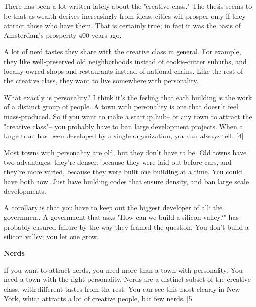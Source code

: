 There
                  has been a lot written lately about the "creative class." The
                  thesis seems to be that as wealth derives increasingly from
                  ideas, cities will prosper only if they attract those who have
                  them. That is certainly true; in fact it was the basis of
                  Amsterdam's prosperity 400 years ago.

A lot of nerd
                  tastes they share with the creative class in general. For
                  example, they like well-preserved old neighborhoods instead of
                  cookie-cutter suburbs, and locally-owned shops and restaurants
                  instead of national chains. Like the rest of the creative
                  class, they want to live somewhere with personality.

What
                  exactly is personality? I think it's the feeling that each
                  building is the work of a distinct group of people. A town
                  with personality is one that doesn't feel mass-produced. So if
                  you want to make a startup hub-- or any town to attract the
                  "creative class"-- you probably have to ban large development
                  projects. When a large tract has been developed by a single
                  organization, you can always tell.
                  [\href{\#f4n}{4}]

Most towns with personality are old, but they
                  don't have to be. Old towns have two advantages: they're
                  denser, because they were laid out before cars, and they're
                  more varied, because they were built one building at a time.
                  You could have both now. Just have building codes that ensure
                  density, and ban large scale developments.

A
                  corollary is that you have to keep out the biggest developer
                  of all: the government. A government that asks "How can we
                  build a silicon valley?" has probably ensured failure by the
                  way they framed the question. You don't build a silicon
                  valley; you let one grow.

\textbf{Nerds}

If you want to attract nerds, you need more than
                  a town with personality. You need a town with the right
                  personality. Nerds are a distinct subset of the creative
                  class, with different tastes from the rest. You can see this
                  most clearly in New York, which attracts a lot of creative
                  people, but few nerds.
                  [\href{\#f5n}{5}]

